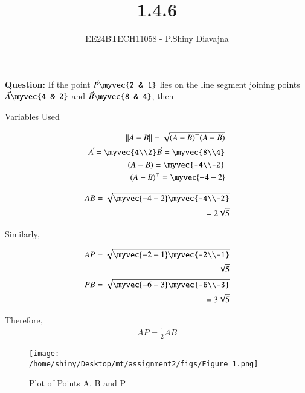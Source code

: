 \documentclass[journal]{IEEEtran}
\begin{document}

\vspace{3cm}

\title{1.4.6}
\author{EE24BTECH11058 - P.Shiny Diavajna}
{\let\newpage\relax\maketitle}

\renewcommand{\thefigure}{\theenumi}
\renewcommand{\thetable}{\theenumi}
\setlength{\intextsep}{10pt} %


\renewcommand{\thetable}{\theenumi}

\textbf{Question:} If the point $\vec{P}\myvec{2 & 1}$ lies on the line segment joining points $\vec{A}\myvec{4 & 2}$ and $\vec{B}\myvec{8 & 4}$, then \\

   \solution
   \begin{table}[h!]    
     \centering
     
     \caption{Variables Used}
     \label{tab1.4.6.1}
   \end{table}


   \begin{align*}
      ||A-B||=\sqrt{(A-B)^\top(A-B)}\\
      \vec{A}=\myvec{4\\2}   \vec{B}=\myvec{8\\4}\\
      (A-B)=\myvec{-4\\-2}\\
      (A-B)^\top=\myvec{-4 -2}\\
   \end{align*}

   \begin{align*}
      AB=\sqrt{\myvec{-4 -2} \myvec{-4\\-2}} \\=2\sqrt{5}\\
   \end{align*}
   
   Similarly,

   \begin{align*}
      AP=\sqrt{\myvec{-2 -1} \myvec{-2\\-1}}\\=\sqrt{5}\\
      PB=\sqrt{\myvec{-6 -3} \myvec{-6\\-3}}\\=3\sqrt{5}\\
   \end{align*}

 Therefore,
   \begin{align*}
     AP=\frac{1}{2}AB
   \end{align*}

  \begin{figure}[h]
    \centering
    \texttt{[image: /home/shiny/Desktop/mt/assignment2/figs/Figure\_1.png]}
    \caption{Plot of Points A, B and P}
 \end{figure}
\end{document}
